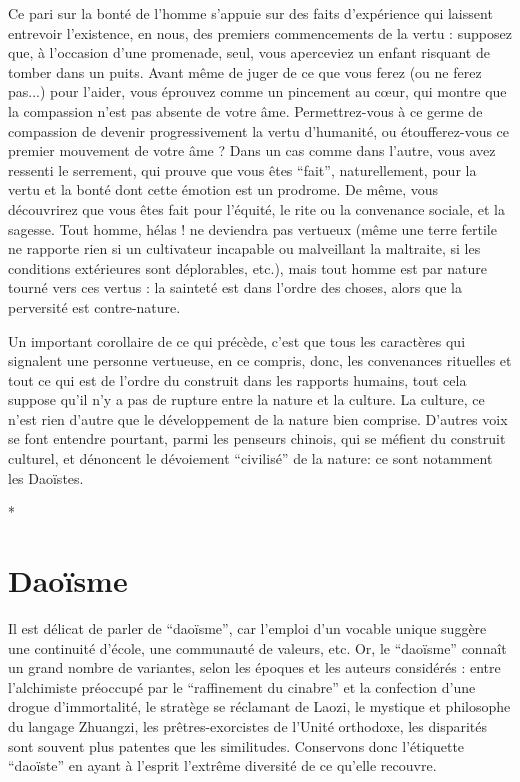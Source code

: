 \documentclass[11pt,a4paper]{article} %
\begin{document}
Ce pari sur la bonté de l'homme s'appuie sur des faits d'expérience qui laissent entrevoir
l'existence, en nous, des premiers commencements de la vertu : supposez que, à
l'occasion d'une promenade, seul, vous aperceviez un enfant risquant de tomber dans un
puits.
Avant même de juger de ce que vous ferez (ou ne ferez pas...) pour l'aider, vous
éprouvez comme un pincement au cœur, qui montre que la compassion n'est pas absente
de votre âme.
Permettrez-vous à ce germe de compassion de devenir progressivement la
vertu d'humanité, ou étoufferez-vous ce premier mouvement de votre âme ? Dans un cas
comme dans l'autre, vous avez ressenti le serrement, qui prouve que vous êtes ``fait'',
naturellement, pour la vertu et la bonté dont cette émotion est un prodrome.
De même,
vous découvrirez que vous êtes fait pour l'équité, le rite ou la convenance sociale, et la
sagesse.
Tout homme, hélas ! ne deviendra pas vertueux (même une terre fertile ne rapporte
rien si un cultivateur incapable ou malveillant la maltraite, si les conditions
extérieures sont déplorables, etc.), mais tout homme est par nature tourné vers ces vertus :
la sainteté est dans l'ordre des choses, alors que la perversité est contre-nature.

Un important corollaire de ce qui précède, c'est que tous les caractères qui signalent une
personne vertueuse, en ce compris, donc, les convenances rituelles et tout ce qui est de
l'ordre du construit dans les rapports humains, tout cela suppose qu'il n'y a pas de rupture
entre la nature et la culture.
La culture, ce n'est rien d'autre que le développement de la nature bien comprise.
D'autres voix se font entendre pourtant, parmi les penseurs chinois,
qui se méfient du construit culturel, et dénoncent le dévoiement ``civilisé'' de la nature:
ce sont notamment les Daoïstes.
\begin{center}*\end{center}
\section{Daoïsme}
Il est délicat de parler de ``daoïsme'', car l'emploi d'un vocable unique suggère une
continuité d'école, une communauté de valeurs, etc.
Or, le ``daoïsme'' connaît un grand
nombre de variantes, selon les époques et les auteurs considérés : entre l'alchimiste
préoccupé par le ``raffinement du cinabre'' et la confection d'une drogue d'immortalité, le
stratège se réclamant de Laozi, le mystique et philosophe du langage Zhuangzi, les
prêtres-exorcistes de l'Unité orthodoxe, les disparités sont souvent plus patentes que les
similitudes.
Conservons donc l'étiquette ``daoïste'' en ayant à l'esprit l'extrême diversité
de ce qu'elle recouvre.
\end{document}
